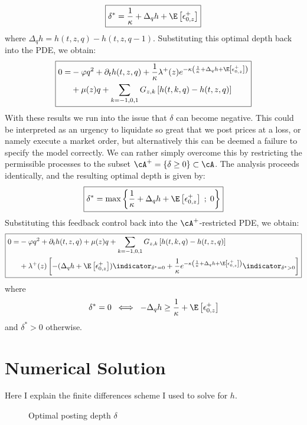 \documentclass[12pt]{article}
\newlength\figureheight
\newlength\figurewidth
\begin{document}
\begin{equation}\label{eq:ch12depth}
\boxed{\delta^{*} = \dfrac{1}{\kappa} + \Delta_q h + \E \left[ \epsilon^+_{0,z} \right]}
\end{equation}
where $\Delta_q h = h(t,z,q) - h(t,z,q-1)$. Substituting this optimal depth back into the PDE, we obtain: 
\begin{equation}
\label{eq:ch12PDEfinal}
\boxed{
\begin{split}
0 = & - \varphi q^2 + \partial_t h(t,z,q) + \dfrac{1}{\kappa} \lambda^+(z) e^{ -\kappa \left( \frac{1}{\kappa} + \Delta_q h + \E \left[ \epsilon^+_{0,z} \right] \right) } \\
 & + \mu(z) q + \sum_{k=-1,0,1} G_{z,k} \left[ h(t,k,q) - h(t,z,q) \right]
\end{split}
}
\end{equation}
With these results we run into the issue that $\delta$ can become negative. This could be interpreted as an urgency to liquidate so great that we post prices at a loss, or namely execute a market order, but alternatively this can be deemed a failure to specify the model correctly. We can rather simply overcome this by restricting the permissible processes to the subset $\cA^+ = \{ \delta \geq 0 \} \subset \cA$. The analysis proceeds identically, and the resulting optimal depth is given by:
\begin{equation}\label{eq:ch12depthpositive}
\boxed{\delta^{*} = \max \left\lbrace \dfrac{1}{\kappa} + \Delta_q h + \E \left[ \epsilon^+_{0,z} \right] \; ; \; 0 \right\rbrace }
\end{equation}
Substituting this feedback control back into the $\cA^+$-restricted PDE, we obtain:
\begin{equation}
\label{eq:ch12PDEfinalpositive}
\boxed{
\begin{split}
0 = & - \varphi q^2 + \partial_t h(t,z,q) + \mu(z) q + \sum_{k=-1,0,1} G_{z,k} \left[ h(t,k,q) - h(t,z,q) \right] \\
 & + \lambda^+(z) \left[-(\Delta_q h + \E \left[ \epsilon^+_{0,z} \right]) \indicator_{\delta^*=0} + \frac{1}{\kappa} e^{ -\kappa \left( \frac{1}{\kappa} + \Delta_q h + \E \left[ \epsilon^+_{0,z} \right] \right) } \indicator_{\delta^*>0} \right]
\end{split}
}
\end{equation}
where 
\[\delta^*=0 \; \iff \; -\Delta_q h \geq \frac{1}{\kappa} + \E \left[ \epsilon^+_{0,z} \right]\]
and $\delta^*>0$ otherwise.

\section*{Numerical Solution}
Here I explain the finite differences scheme I used to solve for $h$.
\begin{figure}
  \centering
  \setlength{} 
  \setlength{}
  
  \caption{Optimal posting depth $\delta$}
  \label{fig:126a}
\end{figure}
\end{document}
